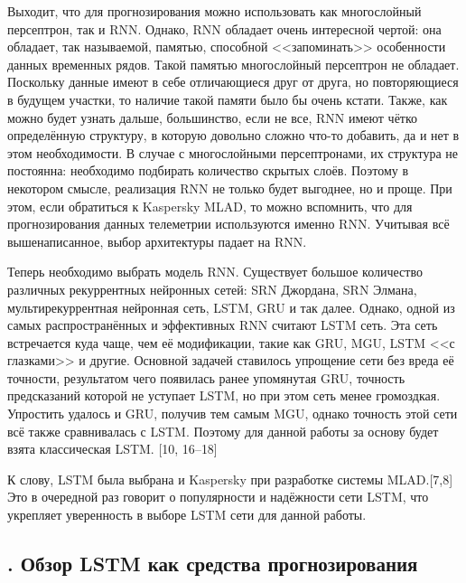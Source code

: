 {  \par \redline Выходит, что для прогнозирования можно использовать как многослойный персептрон, так и RNN. Однако, RNN обладает очень интересной чертой: она обладает, так называемой, памятью, способной <<запоминать>> особенности данных временных рядов. Такой памятью многослойный персептрон не обладает. Поскольку данные имеют в себе отличающиеся друг от друга, но повторяющиеся в будущем участки, то наличие такой памяти было бы очень кстати. Также, как можно будет узнать дальше, большинство, если не все, RNN имеют чётко определённую структуру, в которую довольно сложно что-то добавить, да и нет в этом необходимости. В случае с многослойными персептронами, их структура не постоянна: необходимо подбирать количество скрытых слоёв. Поэтому в некотором смысле, реализация RNN не только будет выгоднее, но и проще. При этом, если обратиться к Kaspersky MLAD, то можно вспомнить, что для прогнозирования данных телеметрии используются именно RNN. Учитывая всё вышенаписанное, выбор архитектуры падает на RNN.

  \par \redline Теперь необходимо выбрать модель RNN. Существует большое количество различных рекуррентных нейронных сетей: SRN Джордана, SRN Элмана, мультирекуррентная нейронная сеть, LSTM, GRU и так далее. Однако, одной из самых распространённых и эффективных RNN считают LSTM сеть. Эта сеть встречается куда чаще, чем её модификации, такие как GRU, MGU, LSTM <<с глазками>> и другие. Основной задачей ставилось упрощение сети без вреда её точности, результатом чего появилась ранее упомянутая GRU, точность предсказаний которой не уступает LSTM, но при этом сеть менее громоздкая. Упростить удалось и GRU, получив тем самым MGU, однако точность этой сети всё также сравнивалась с LSTM. Поэтому для данной работы за основу будет взята классическая LSTM. [10, 16{--}18]

  \par \redline К слову, LSTM была выбрана и Kaspersky при разработке системы MLAD.[7,8] Это в очередной раз говорит о популярности и надёжности сети LSTM, что укрепляет уверенность в выборе LSTM сети для данной работы. 

  \par
}

\subtitlespace

\subsection*{ 
  \gostTitleFont
  \redline
  \thechaptercntr .\thesubchaptercntr \spc 
  Обзор LSTM как средства прогнозирования
} \addtocounter{subchaptercntr}{1} 
  
